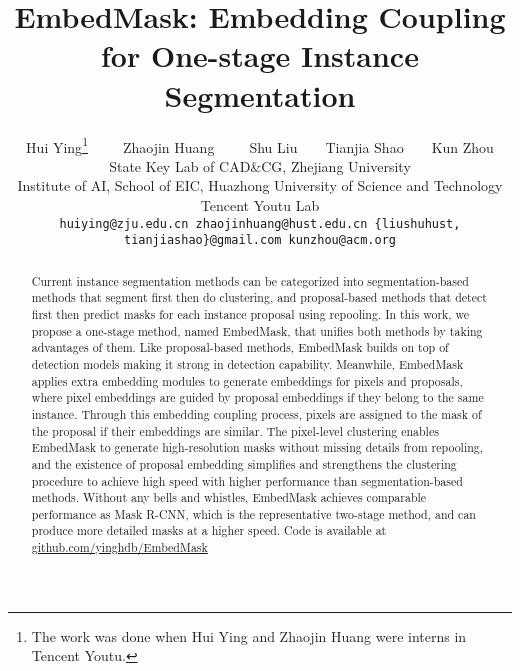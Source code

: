 \documentclass[10pt,twocolumn,letterpaper]{article}
\begin{document}
\title{EmbedMask: Embedding Coupling for One-stage Instance Segmentation}



\author{Hui Ying\thanks{The work was done when Hui Ying and Zhaojin Huang were interns in Tencent Youtu.}\ \ \ \ \ Zhaojin Huang\footnotemark[1]\ \ \ \ \ Shu Liu\ \ \ \ Tianjia Shao\ \ \ \ Kun Zhou \\
 State Key Lab of CAD\&CG, Zhejiang University \\ 
Institute of AI, School of EIC, Huazhong University of Science and Technology \\
Tencent Youtu Lab \\
{\tt\small huiying@zju.edu.cn zhaojinhuang@hust.edu.cn \{liushuhust, tianjiashao\}@gmail.com kunzhou@acm.org}
}

\maketitle


\begin{abstract}
Current instance segmentation methods can be categorized into segmentation-based methods that segment first then do clustering, and proposal-based methods that detect first then predict masks for each instance proposal using repooling. In this work, we propose a one-stage method, named EmbedMask, that unifies both methods by taking advantages of them. Like proposal-based methods, EmbedMask builds on top of detection models making it strong in detection capability. Meanwhile, EmbedMask applies extra embedding modules to generate embeddings for pixels and proposals, where pixel embeddings are guided by proposal embeddings if they belong to the same instance. Through this embedding coupling process, pixels are assigned to the mask of the proposal if their embeddings are similar. The pixel-level clustering enables EmbedMask to generate high-resolution masks without missing details from repooling, and the existence of proposal embedding simplifies and strengthens the clustering procedure to achieve high speed with higher performance than segmentation-based methods. Without any bells and whistles, EmbedMask achieves comparable performance as Mask R-CNN, which is the representative two-stage method, and can produce more detailed masks at a higher speed. 
Code is available at \href{https://github.com/yinghdb/EmbedMask}{github.com/yinghdb/EmbedMask}



\end{abstract}
\end{document}
